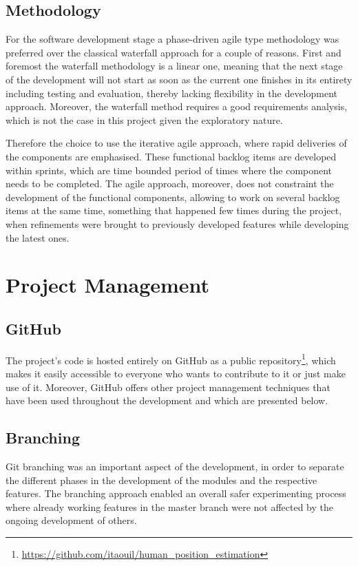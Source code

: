 \subsection{Methodology}

For the software development stage a phase-driven agile type methodology was preferred over the classical waterfall approach for a couple of reasons. First and foremost the waterfall methodology is a linear one, meaning that the next stage of the development will not start as soon as the current one finishes in its entirety including testing and evaluation, thereby lacking flexibility in the development approach. Moreover, the waterfall method requires a good requirements analysis, which is not the case in this project given the exploratory nature.

Therefore the choice to use the iterative agile approach, where rapid deliveries of the components are emphasised. These functional backlog items are developed within sprints, which are time bounded period of times where the component needs to be completed. The agile approach, moreover, does not constraint the development of the functional components, allowing to work on several backlog items at the same time, something that happened few times during the project, when refinements were brought to previously developed features while developing the latest ones.

\section{Project Management}

\subsection{GitHub}

The project's code is hosted entirely on GitHub as a public repository\footnote{ \url{https://github.com/itaouil/human_position_estimation}}, which makes it easily accessible to everyone who wants to contribute to it or just make use of it. Moreover, GitHub offers other project management techniques that have been used throughout the development and which are presented below.

\subsection{Branching}

Git branching was an important aspect of the development, in order to separate the different phases in the development of the modules and the respective features. The branching approach enabled an overall safer experimenting process where already working features in the master branch were not affected by the ongoing development of others. 

